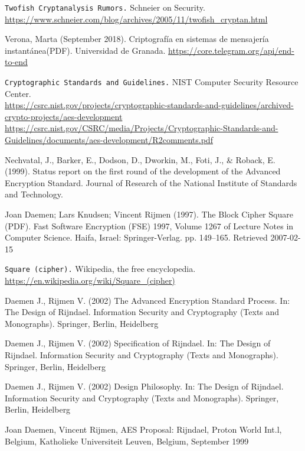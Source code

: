 \begin{thebibliography}{10}
		\texttt{Twofish Cryptanalysis Rumors.} Schneier on Security.\\
			\url{https://www.schneier.com/blog/archives/2005/11/twofish_cryptan.html}
	
		Verona, Marta (September 2018). Criptografía en sistemas de mensajería instantánea(PDF). Universidad de Granada.
		\url{https://core.telegram.org/api/end-to-end}
	
		\texttt{Cryptographic Standards and Guidelines.} NIST Computer Security Resource Center.\\
			\url{https://csrc.nist.gov/projects/cryptographic-standards-and-guidelines/archived-crypto-projects/aes-development}
			\url{https://csrc.nist.gov/CSRC/media/Projects/Cryptographic-Standards-and-Guidelines/documents/aes-development/R2comments.pdf}
	
		Nechvatal, J., Barker, E., Dodson, D., Dworkin, M., Foti, J., \& Roback, E. (1999). Status report on the first round of the development of the Advanced Encryption Standard. Journal of Research of the National Institute of Standards and Technology.
	
		Joan Daemen; Lars Knudsen; Vincent Rijmen (1997). The Block Cipher Square (PDF). Fast Software Encryption (FSE) 1997, Volume 1267 of Lecture Notes in Computer Science. Haifa, Israel: Springer-Verlag. pp. 149–165. Retrieved 2007-02-15
	
		\texttt{Square (cipher).} Wikipedia, the free encyclopedia.\\
			\url{https://en.wikipedia.org/wiki/Square_(cipher)}
	
		Daemen J., Rijmen V. (2002) The Advanced Encryption Standard Process. In: The Design of Rijndael. Information Security and Cryptography (Texts and Monographs). Springer, Berlin, Heidelberg

		Daemen J., Rijmen V. (2002) Specification of Rijndael. In: The Design of Rijndael. Information Security and Cryptography (Texts and Monographs). Springer, Berlin, Heidelberg

		Daemen J., Rijmen V. (2002) Design Philosophy. In: The Design of Rijndael. Information Security and Cryptography (Texts and Monographs). Springer, Berlin, Heidelberg
	
		Joan Daemen, Vincent Rijmen, AES Proposal: Rijndael, Proton World Int.l, Belgium, Katholieke Universiteit Leuven, Belgium,  September 1999 \\
	

\end{thebibliography}
